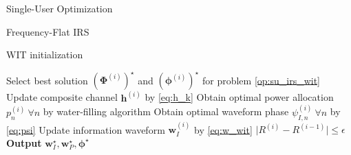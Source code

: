 \documentclass{IEEEtran}
\begin{document}
\begin{section}{Single-User Optimization}
\begin{subsection}{Frequency-Flat IRS}
\begin{subsection}{WIT initialization}
\begin{algorithm}
\begin{algorithmic}[1]
					\State Select best solution $(\boldsymbol{\Phi}^{(i)})^\star$ and $(\boldsymbol{\phi}^{(i)})^\star$ for problem \ref{op:su_irs_wit}
					\State Update composite channel $\boldsymbol{h}^{(i)}$ by \ref{eq:h_k}
					\State Obtain optimal power allocation $p_n^{(i)} \ \forall n$ by water-filling algorithm
					\State Obtain optimal waveform phase $\psi_{I,n}^{(i)} \ \forall n$ by \ref{eq:psi}
					\State Update information waveform $\boldsymbol{w}_I^{(i)}$ by \ref{eq:w_wit}
					\Until $\lvert R^{(i)}-R^{(i-1)} \rvert \le \epsilon$
					\State \textbf{Output} $\boldsymbol{w}_I^\star, \boldsymbol{w}_P^\star, \boldsymbol{\phi}^\star$
				\end{algorithmic}
			\end{algorithm}
		\end{subsection}
	\end{subsection}
\end{section}



\end{document}
